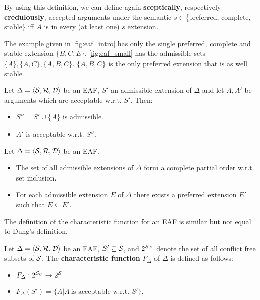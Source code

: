 By using this definition, we can define again \textbf{sceptically}, respectively \textbf{credulously}, accepted arguments under the semantic $ s \in $\{preferred, complete, stable\} iff $A$ is in every (at least one) $s$ extension. 
\begin{exa}
	The example given in \autoref{fig:eaf_intro} has only the single preferred, complete and stable extension $\{B, C, E\}$. \autoref{fig:eaf_small} has the admissible sets $\{A\}, \{A, C\}, \{A, B, C\}$. $\{A, B, C\}$ is the only preferred extension that is as well stable.
\end{exa}


\begin{lemma}
	Let $\Delta = \langle \S, \R, \D \rangle$ be an \gls{EAF}, $S'$ an admissible extension of $\Delta$ and let $A, A'$ be arguments which are acceptable w.r.t. $S'$. Then:
	\begin{itemize}
		\item $S'' = S' \cup \{A\}$ is admissible.
		\item $A'$ is acceptable w.r.t. $S''$.
	\end{itemize}	
\end{lemma}

\begin{lemma}
	Let $\Delta = \langle \S, \R, \D \rangle$ be an \gls{EAF}. 
	\begin{itemize}
		\item The set of all admissible extensions of $\Delta$ form a complete partial order w.r.t. set inclusion.
		\item For each admissible extension $E$ of $\Delta$ there exists a preferred extension $E'$ such that $E\subseteq E'$.
	\end{itemize}
	\label{lem:eaf:partialorder}
\end{lemma}

The definition of the characteristic function for an \gls{EAF} is similar but not equal to Dung's definition. 

\begin{definition}
	Let $\Delta = \langle \S, \R, \D \rangle$ be an \gls{EAF}, $S'\subseteq \S$, and $2^{\S_C}$ denote the set of all conflict free subsets of $\S$. The \textbf{characteristic function} $F_\Delta$ of $\Delta$ is defined as follows:
	\begin{itemize}
		\item $F_\Delta: 2^{\S_C} \rightarrow 2^{\S}$
		\item $F_\Delta(S') = \{A | A~\text{is acceptable w.r.t.~}S'\}$.
	\end{itemize}
\end{definition}


